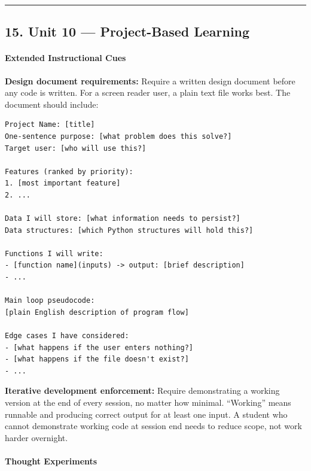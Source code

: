 \documentclass[
  justified,
  openright,
]{tufte-book}
\let\subsubsection\paragraph
\let\paragraph\paragraph
\let\subsubsection\paragraph
\let\paragraph\paragraph
\begin{document}
\begin{center}\rule{0.5\linewidth}{0.5pt}\end{center}

\subsection{15. Unit 10 --- Project-Based
Learning}\label{unit-10-project-based-learning}

\subsubsection{Extended Instructional
Cues}\label{extended-instructional-cues-3}

\textbf{Design document requirements:} Require a written design document
before any code is written. For a screen reader user, a plain text file
works best. The document should include:

\begin{verbatim}
Project Name: [title]
One-sentence purpose: [what problem does this solve?]
Target user: [who will use this?]

Features (ranked by priority):
1. [most important feature]
2. ...

Data I will store: [what information needs to persist?]
Data structures: [which Python structures will hold this?]

Functions I will write:
- [function name](inputs) -> output: [brief description]
- ...

Main loop pseudocode:
[plain English description of program flow]

Edge cases I have considered:
- [what happens if the user enters nothing?]
- [what happens if the file doesn't exist?]
- ...
\end{verbatim}

\textbf{Iterative development enforcement:} Require demonstrating a
working version at the end of every session, no matter how minimal.
``Working'' means runnable and producing correct output for at least one
input. A student who cannot demonstrate working code at session end
needs to reduce scope, not work harder overnight.

\paragraph{Thought Experiments}\label{thought-experiments-17}
\end{document}
